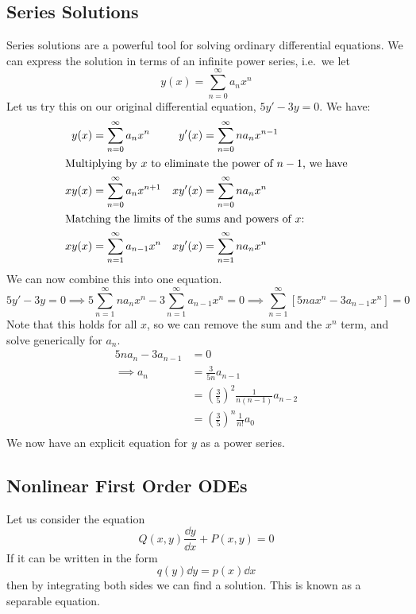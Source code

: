 \subsection{Series Solutions}
Series solutions are a powerful tool for solving ordinary differential equations.
We can express the solution in terms of an infinite power series, i.e.\ we let
\[
	y(x) = \sum_{n=0}^\infty a_n x^n
\]
Let us try this on our original differential equation, \(5y' - 3y = 0\).
We have:
\begin{align*}
	y(x)  & = \sum_{n=0}^\infty a_n x^n     & y'(x)  & = \sum_{n=0}^\infty na_n x^{n-1} \\
	\intertext{Multiplying by \(x\) to eliminate the power of \(n-1\), we have}
	xy(x) & = \sum_{n=0}^\infty a_n x^{n+1} & xy'(x) & = \sum_{n=0}^\infty na_n x^n     \\
	\intertext{Matching the limits of the sums and powers of \(x\):}
	xy(x) & = \sum_{n=1}^\infty a_{n-1}x^n  & xy'(x) & = \sum_{n=1}^\infty na_n x^n     \\
\end{align*}
We can now combine this into one equation.
\[
	5y' - 3y = 0 \implies 5\sum_{n=1}^\infty na_n x^n - 3\sum_{n=1}^\infty a_{n-1}x^n = 0 \implies \sum_{n=1}^\infty \left[ 5nax^n - 3a_{n-1}x^n \right] = 0
\]
Note that this holds for all \(x\), so we can remove the sum and the \(x^n\) term, and solve generically for \(a_n\).
\begin{align*}
	5na_n - 3a_{n-1} & = 0                                                   \\
	\implies a_n     & = \frac{3}{5n} a_{n-1}                                \\
	                 & = \left(\frac{3}{5}\right)^2 \frac{1}{n(n-1)} a_{n-2} \\
	                 & = \left(\frac{3}{5}\right)^n \frac{1}{n!} a_{0}       \\
\end{align*}
We now have an explicit equation for \(y\) as a power series.

\subsection{Nonlinear First Order ODEs}
Let us consider the equation
\[
	Q(x, y)\frac{\dd{y}}{\dd{x}} + P(x, y) = 0
\]
If it can be written in the form
\[
	q(y) \dd{y} = p(x) \dd{x}
\]
then by integrating both sides we can find a solution.
This is known as a separable equation.


